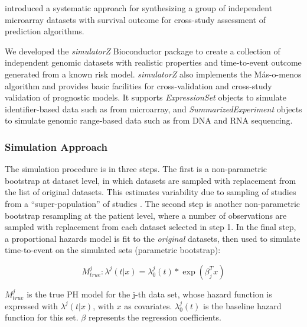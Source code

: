\documentclass{bioinfo}
\begin{document}
  \citet{Bernau2014} introduced a systematic approach for synthesizing a
  group of independent microarray datasets with survival outcome for
  cross-study assessment of prediction algorithms. %

  We developed the \emph{simulatorZ} Bioconductor package to
  create a collection of independent genomic datasets with
  realistic properties and time-to-event outcome generated from a
  known risk model. \emph{simulatorZ} also implements the M\'{a}s-o-menos algorithm
  \citep{Zhao2014,donoho2008higher} and provides basic facilities for 
  cross-validation and cross-study validation of prognostic models.
  It supports \emph{ExpressionSet} objects to simulate
  identifier-based data such as from microarray, and
  \emph{SummarizedExperiment} objects to simulate genomic range-based
  data such as from DNA and RNA sequencing.

    \subsubsection{Simulation Approach}
    The simulation procedure is in three steps. The first is a non-parametric
    bootstrap at dataset level, in which datasets are sampled with
    replacement from the list of original datasets. This
    estimates variability due to sampling of studies from a
    ``super-population'' of studies \citep{Hartley1975-bj}.  The
    second step is another
    non-parametric bootstrap resampling at the patient
    level, where a number of observations are sampled with replacement from
    each dataset selected in step 1.
    In the final step, a proportional hazards model is fit to the \emph{original} datasets, then used to
    simulate time-to-event on the simulated sets (parametric
    bootstrap):

    \begin{equation}\label{coxfunction}
      M^{j}_{true} : \lambda^{j}(t|x) = \lambda^{j}_{0}(t) * \exp(\beta_{j}^{T}x)
    \end{equation}

    $M^{j}_{true}$ is the true PH model for the j-th data set,
    whose hazard function is expressed with $\lambda^{j}(t|x)$,
    with $x$ as covariates. $\lambda^{j}_{0}(t)$ is the baseline
    hazard function for this set. $\beta$ represents the regression
    coefficients.
\end{document}
